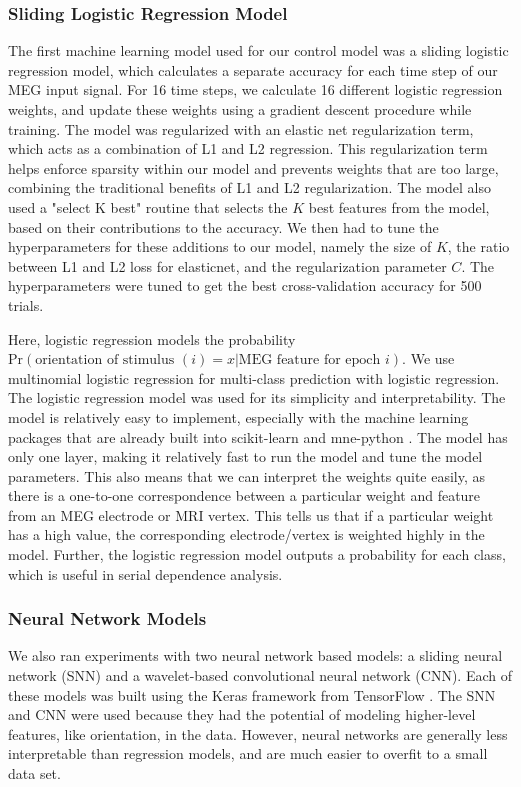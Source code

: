 \documentclass[../main.tex]{subfiles}
\begin{document}
\subsubsection{Sliding Logistic Regression Model}
The first machine learning model used for our control model was a sliding logistic regression model, which calculates a separate accuracy for each time step of our MEG input signal. For 16 time steps, we calculate 16 different logistic regression weights, and update these weights using a gradient descent procedure while training. The model was regularized with an elastic net regularization term, which acts as a combination of L1 and L2 regression. This regularization term helps enforce sparsity within our model and prevents weights that are too large, combining the traditional benefits of L1 and L2 regularization. The model also used a "select K best" routine that selects the $K$ best features from the model, based on their contributions to the accuracy. We then had to tune the hyperparameters for these additions to our model, namely the size of $K$, the ratio between L1 and L2 loss for elasticnet, and the regularization parameter $C$. The hyperparameters were tuned to get the best cross-validation accuracy for 500 trials.

Here, logistic regression models the probability $\mathrm{Pr}(\textrm{orientation of stimulus } (i) = x | \textrm{MEG feature for epoch } i)$. We use multinomial logistic regression for multi-class prediction with logistic regression. The logistic regression model was used for its simplicity and interpretability. The model is relatively easy to implement, especially with the machine learning packages that are already built into scikit-learn \citep{scikit-learn} and mne-python \citep{mne}. The model has only one layer, making it relatively fast to run the model and tune the model parameters. This also means that we can interpret the weights quite easily, as there is a one-to-one correspondence between a particular weight and feature from an MEG electrode or MRI vertex. This tells us that if a particular weight has a high value, the corresponding electrode/vertex is weighted highly in the model. Further, the logistic regression model outputs a probability for each class, which is useful in serial dependence analysis.

\subsubsection{Neural Network Models}
We also ran experiments with two neural network based models: a sliding neural network (SNN) and a wavelet-based convolutional neural network (CNN). Each of these models was built using the Keras framework from TensorFlow \citep{chollet2015keras, tensorflow2015-whitepaper}. The SNN and CNN were used because they had the potential of modeling higher-level features, like orientation, in the data. However, neural networks are generally less interpretable than regression models, and are much easier to overfit to a small data set. 
\end{document}
